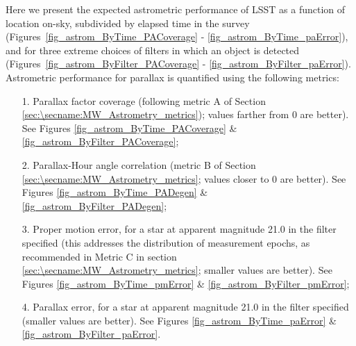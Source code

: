 Here we present the expected astrometric performance of LSST as a function of
location on-sky, subdivided by elapsed time in the survey
(Figures~\ref{fig_astrom_ByTime_PACoverage} -
\ref{fig_astrom_ByTime_paError}), and for three extreme choices of filters in
which an object is detected (Figures~\ref{fig_astrom_ByFilter_PACoverage} -
\ref{fig_astrom_ByFilter_paError}).  Astrometric performance for parallax is
quantified using the following metrics:
\begin{itemize}
  \item[1.] Parallax factor coverage (following metric A of Section \ref{sec:\secname:MW_Astrometry_metrics}); values farther from 0 are better). See Figures \ref{fig_astrom_ByTime_PACoverage} \&  \ref{fig_astrom_ByFilter_PACoverage};
    \item[2.] Parallax-Hour angle correlation (metric B of Section \ref{sec:\secname:MW_Astrometry_metrics}; values closer to 0 are better). See Figures \ref{fig_astrom_ByTime_PADegen} \& \ref{fig_astrom_ByFilter_PADegen};
      \item[3.] Proper motion error, for a star at apparent magnitude 21.0 in the filter specified (this addresses the distribution of measurement epochs, as recommended in Metric C in section \ref{sec:\secname:MW_Astrometry_metrics}; smaller values are better). See Figures \ref{fig_astrom_ByTime_pmError} \& \ref{fig_astrom_ByFilter_pmError};
        \item[4.] Parallax error, for a star at apparent magnitude 21.0 in the filter specified (smaller values are better). See Figures \ref{fig_astrom_ByTime_paError} \& \ref{fig_astrom_ByFilter_paError}.
\end{itemize}

